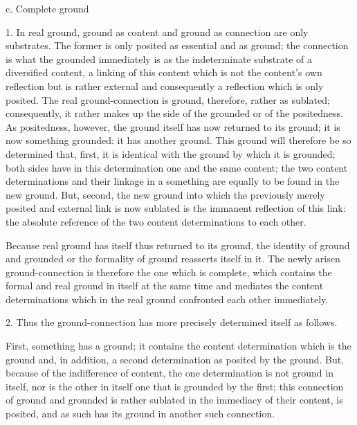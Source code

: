 c. Complete ground

1. In real ground, ground as content
and ground as connection are only substrates.
The former is only posited as essential and as ground;
the connection is what the grounded immediately is
as the indeterminate substrate of a diversified content,
a linking of this content which is not the content's own reflection
but is rather external and consequently a reflection which is only posited.
The real ground-connection is ground, therefore, rather as sublated;
consequently, it rather makes up the side of
the grounded or of the positedness.
As positedness, however, the ground itself
has now returned to its ground;
it is now something grounded: it has another ground.
This ground will therefore be so determined that,
first, it is identical with the ground by which it is grounded;
both sides have in this determination one and the same content;
the two content determinations and their linkage in
a something are equally to be found in the new ground.
But, second, the new ground into which
the previously merely posited and external link
is now sublated is the immanent reflection of this link:
the absolute reference of the two content determinations to each other.

Because real ground has itself thus returned to its ground,
the identity of ground and grounded
or the formality of ground reasserts itself in it.
The newly arisen ground-connection is
therefore the one which is complete,
which contains the formal and real ground in itself
at the same time and mediates the content determinations
which in the real ground confronted each other immediately.

2. Thus the ground-connection has more precisely
determined itself as follows.

First, something has a ground;
it contains the content determination which is the ground
and, in addition, a second determination as posited by the ground.
But, because of the indifference of content,
the one determination is not ground in itself,
nor is the other in itself one that is grounded by the first;
this connection of ground and grounded is rather
sublated in the immediacy of their content, is posited,
and as such has its ground in another such connection.

